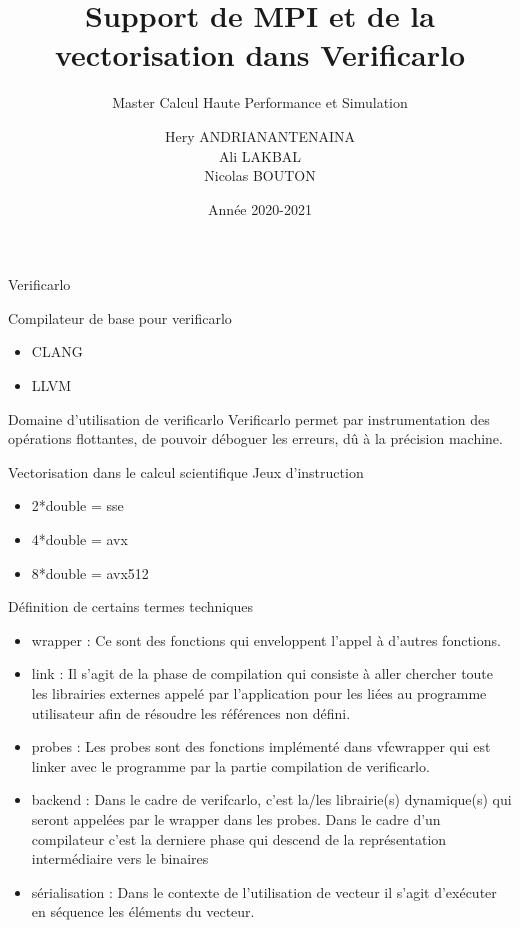 \documentclass{beamer}
\title[Support pour Verificarlo]{Support de MPI et de la vectorisation dans Verificarlo}
\subtitle{Master Calcul Haute Performance et Simulation}
\author[Hery, Ali, Nicolas]{Hery ANDRIANANTENAINA \\ Ali LAKBAL \\ Nicolas BOUTON}
\institute[]{\textbf{Encadrant:} Eric PETIT}
\date{Année 2020-2021}
\begin{document}
\maketitle

\begin{frame}{Verificarlo}
    \begin{block}{Compilateur de base pour verificarlo}
      \begin{itemize}
          \item CLANG
          \item LLVM
      \end{itemize}
    \end{block}
  \begin{block}{Domaine d'utilisation de verificarlo}
    Verificarlo permet par instrumentation des opérations flottantes, de pouvoir déboguer les erreurs, dû à la précision machine.
  \end{block}
  \begin{block}{Vectorisation dans le calcul scientifique}
    Jeux d'instruction 
        \begin{itemize}
            \item 2*double = sse
            \item 4*double = avx
            \item 8*double = avx512
        \end{itemize}
  \end{block}
\end{frame}

\begin{frame}{Définition de certains termes techniques}
      \begin{itemize}
          \item wrapper : Ce sont des fonctions qui enveloppent l’appel à d’autres fonctions.
          \item link : Il s’agit de la phase de compilation qui consiste à aller chercher toute les librairies externes appelé par l’application pour les liées au programme utilisateur afin de résoudre les références non défini.
          \item probes : Les probes sont des fonctions implémenté dans vfcwrapper qui est linker avec le programme par la partie compilation de verificarlo.
          \item backend : Dans le cadre de verifcarlo, c’est la/les librairie(s) dynamique(s) qui seront appelées par le wrapper dans les probes. Dans le cadre d’un compilateur c’est la derniere phase qui descend de la représentation intermédiaire vers le binaires
          \item sérialisation : Dans le contexte de l’utilisation de vecteur il s’agit d’exécuter en séquence les éléments du vecteur.
      \end{itemize}
\end{frame}
\end{document}
